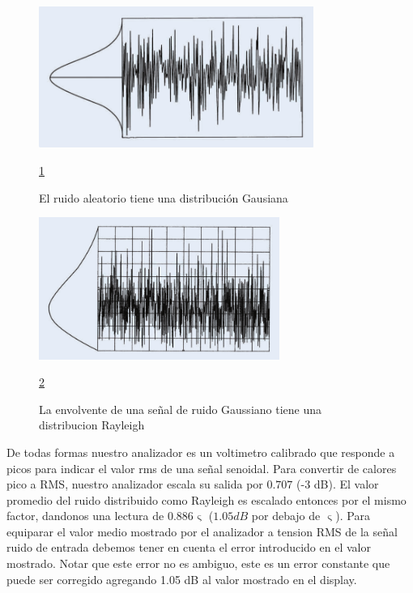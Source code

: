\documentclass[a4paper,12pt,twoside]{article}
\begin{document}
\begin{figure}[H]
    \includegraphics[width=0.8\textwidth]{../img/ruido_gausiano.png}
        \caption{El ruido aleatorio tiene una distribución Gausiana}
        \label{ruido_gausiano}
        \ref{ruido_gausiano}
\end{figure}

\begin{figure}[H]
    \includegraphics[width=0.7\textwidth]{../img/ruido_ray.png}
        \caption{La envolvente de una señal de ruido Gaussiano tiene una distribucion Rayleigh}
        \label{ruido_ray}
        \ref{ruido_ray}
\end{figure}

De todas formas nuestro analizador es un voltimetro calibrado que responde a picos para indicar el valor rms de una señal senoidal. Para convertir de calores pico a RMS, nuestro analizador escala su salida por $0.707$ (-3 dB). El valor promedio del ruido distribuido como Rayleigh es escalado entonces por el mismo factor, dandonos una lectura de $0.886 \upvarsigma$ ($1.05 dB$ por debajo de $\upvarsigma$). Para equiparar el valor medio mostrado por el analizador a tension RMS de la señal ruido de entrada debemos tener en cuenta el error introducido en el valor mostrado. Notar que este error no es ambiguo, este es un error constante que puede ser corregido agregando 1.05 dB al valor mostrado en el display.\newline
\end{document}
